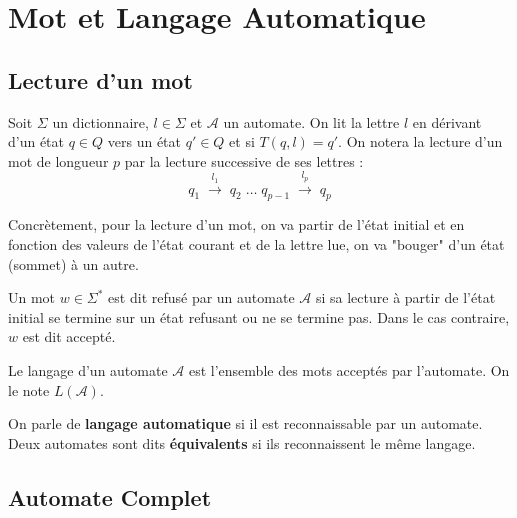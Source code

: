 
\section{Mot et Langage Automatique}

\subsection{Lecture d'un mot}

\begin{definition}
    Soit $\Sigma$ un dictionnaire, $l \in \Sigma$ et $\mathcal{A}$ un automate. 
    On lit la lettre $l$ en dérivant d'un état $q \in Q$ vers un état $q' \in Q$ et si $T(q,l) = q'$. 
    On notera la lecture d'un mot de longueur $p$ par la lecture successive de ses lettres :
        \[ q_1 \;  \overset{l_1}{\longrightarrow} \; q_2 \; \dots \; q_{p-1} \; \overset{l_p}{\longrightarrow} \; q_p \] 
\end{definition}

Concrètement, pour la lecture d'un mot, on va partir de l'état initial et en fonction des valeurs de l'état courant et de 
la lettre lue, on va "bouger" d'un état (sommet) à un autre.

\begin{definition}
    Un mot $w \in \Sigma^*$ est dit refusé par un automate $\mathcal{A}$ si sa lecture à partir de l'état initial 
    se termine sur un état refusant ou ne se termine pas. Dans le cas contraire, $w$ est dit accepté. 
\end{definition}

\begin{definition}
    Le langage d'un automate $\mathcal{A}$ est l'ensemble des mots acceptés par l'automate. 
    On le note $L(\mathcal{A})$. 
\end{definition}

On parle de \textbf{langage automatique} si il est reconnaissable par un automate. 
Deux automates sont dits \textbf{équivalents} si ils reconnaissent le même langage. 

\subsection{Automate Complet}

